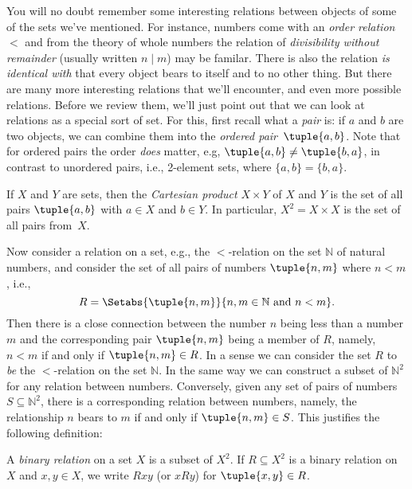 \documentclass[../../include/open-logic-section]{subfiles}
\begin{document}

\begin{explain}
You will no doubt remember some interesting relations between objects
of some of the sets we've mentioned. For instance, numbers come with
an \emph{order relation}~$<$ and from the theory of whole numbers the
relation of \emph{divisibility without remainder} (usually written
$n\mid m$) may be familar. There is also the relation \emph{is
  identical with} that every object bears to itself and to no other
thing. But there are many more interesting relations that we'll
encounter, and even more possible relations. Before we review them,
we'll just point out that we can look at relations as a special sort
of set. For this, first recall what a \emph{pair} is: if $a$ and $b$
are two objects, we can combine them into the \emph{ordered
  pair}~$\tuple{a, b}$.  Note that for ordered pairs the order
\emph{does} matter, e.g, $\tuple{a, b} \neq \tuple{b, a}$, in contrast
to unordered pairs, i.e., 2-element sets, where $\{a, b\}=\{b, a\}$.

If $X$ and $Y$ are sets, then the \emph{Cartesian product} $X\times Y$
of $X$ and $Y$ is the set of all pairs $\tuple{a, b}$ with $a \in X$ and
$b \in Y$. In particular, $X^{2}=X \times X$ is the set of all pairs
from~$X$.

Now consider a relation on a set, e.g., the $<$-relation on the set
$\mathbb{N}$ of natural numbers, and consider the set of all pairs of
numbers $\tuple{n, m}$ where $n<m$, i.e.,
\[
R=\Setabs{\tuple{n, m}}{n, m \in \mathbb{N} \text{ and } n<m}.
\]
Then there is a close connection between the number $n$ being less
than a number $m$ and the corresponding pair $\tuple{n, m}$
being a member of $R$, namely, $n<m$ if and only if $\tuple{n, m}
\in R$. In a sense we can consider the set $R$ to \emph{be} the
$<$-relation on the set $\mathbb{N}$. In the same way we can construct
a subset of $\mathbb{N}^{2}$for any relation between
numbers. Conversely, given any set of pairs of numbers
$S\subseteq\mathbb{N}^{2}$, there is a corresponding relation between
numbers, namely, the relationship $n$ bears to $m$ if and only if
$\tuple{n, m} \in S$. This justifies the following definition:
\end{explain}

\begin{defn}
A \emph{binary relation} on a set $X$ is a subset of $X^{2}$. If
$R\subseteq X^{2}$ is a binary relation on~$X$ and $x, y \in X$,
we write $Rxy$ (or $xRy$) for $\tuple{x, y} \in R$.
\end{defn}
\end{document}
